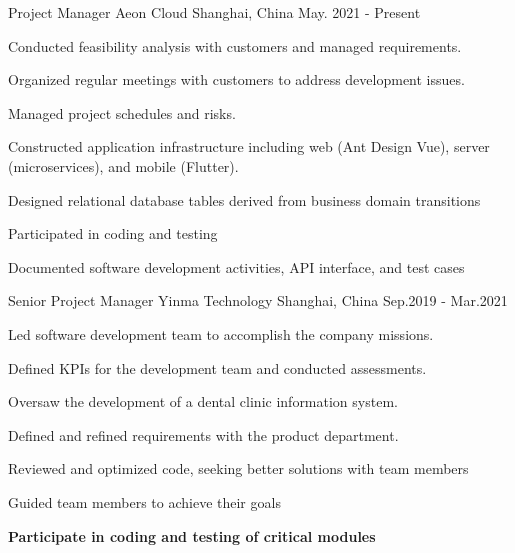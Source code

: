 

\begin{cventries}
  \cventry
    {Project Manager} %
    {Aeon Cloud} %
    {Shanghai, China} %
    {May. 2021 - Present} %
    {
      \begin{cvitems} %
        \item Conducted feasibility analysis with customers and managed requirements.
        \item Organized regular meetings with customers to address development issues. 
        \item Managed project schedules and risks.
        \item {Constructed application infrastructure including web (Ant Design Vue), server (microservices), and mobile (Flutter)}.
        \item Designed relational database tables derived from business domain transitions
        \item Participated in coding and testing
        \item {Documented software development activities, API interface, and test cases}
      \end{cvitems}
    } 

  \cventry
    {Senior Project Manager} %
    {Yinma Technology} %
    {Shanghai, China} %
    {Sep.2019 - Mar.2021} %
    {
      \begin{cvitems} %
        \item {Led software development team to accomplish the company missions.}
        \item {Defined KPIs for the development team and conducted assessments.}
        \item {Oversaw the development of a dental clinic information system.}
        \item {Defined and refined requirements with the product department.}
        \item {Reviewed and optimized code, seeking better solutions with team members}
        \item {Guided team members to achieve their goals}
        \item \textbf{Participate in coding and testing of critical modules}
      \end{cvitems}
    }


\end{cventries}

